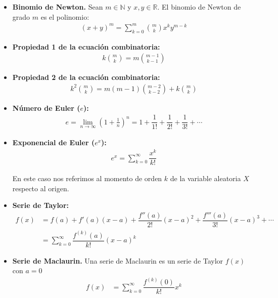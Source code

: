 \documentclass[8pt]{article}
\begin{document}
\begin{itemize}
    \item \textbf{Binomio de Newton.} Sean $m \in \mathbb{N}$ y $x, y \in \mathbb{R}$. El binomio de Newton de grado $m$ es el polinomio:
    \begin{align*}
        \left(x+y\right)^m = \sum_{k=0}^m \binom{m}{k} x^k y^{m-k}
    \end{align*}

    \item \textbf{Propiedad 1 de la ecuación combinatoria:}
    \begin{align*}
        k\binom{m}{k} = m\binom{m-1}{k-1}
    \end{align*}

    \item \textbf{Propiedad 2 de la ecuación combinatoria:}
    \begin{align*}
        k^2\binom{m}{k} = m(m-1)\binom{m-2}{k-2} + k\binom{m}{k}
    \end{align*}

    \item \textbf{Número de Euler ($e$):}
    \begin{align*}
        e = \lim_{n \to \infty} \left(1 + \frac{1}{n}\right)^n = 1 + \dfrac{1}{1!} + \dfrac{1}{2!} + \dfrac{1}{3!} + \cdots
    \end{align*}

    \item \textbf{Exponencial de Euler ($e^x$):}
    \begin{align*}
        e^x = \sum_{k=0}^{\infty} \dfrac{x^k}{k!}
    \end{align*}

    En este caso nos referimos al momento de orden $k$ de la variable aleatoria $X$ respecto al origen.

    \item \textbf{Serie de Taylor:}
    \begin{align*}
        f(x) &= f(a) + f'(a)(x-a) + \dfrac{f''(a)}{2!}(x-a)^2 + \dfrac{f'''(a)}{3!}(x-a)^3 + \cdots \\
        &= \sum_{k=0}^{\infty} \dfrac{f^{(k)}(a)}{k!}(x-a)^k
    \end{align*}

    \item \textbf{Serie de Maclaurin.} Una serie de Maclaurin es un serie de Taylor $f(x)$ con $a=0$
    \begin{align*}
        f(x) &= \sum_{k=0}^{\infty} \dfrac{f^{(k)}(0)}{k!}x^k
    \end{align*}


\end{itemize}
\end{document}
